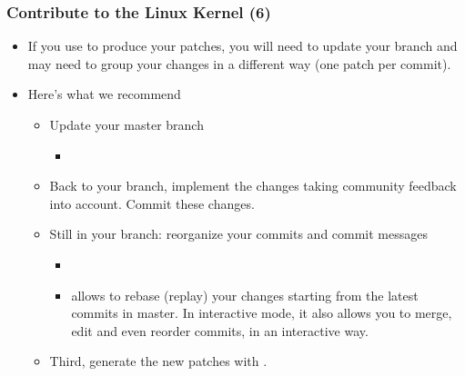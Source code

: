 \begin{frame}
  \frametitle{Contribute to the Linux Kernel (6)}
  \begin{itemize}
  \item If you use  to produce your patches,
    you will need to update your branch and may need to group your
    changes in a different way (one patch per commit).
  \item Here's what we recommend
    \begin{itemize}
    \item Update your master branch
      \begin{itemize}
      \item {}
      \end{itemize}
    \item Back to your branch, implement the changes taking community
      feedback into account. Commit these changes.
    \item Still in your branch: reorganize your commits and commit messages
      \begin{itemize}
      \item {}
      \item {} allows to rebase (replay) your changes
        starting from the latest commits in master. In interactive
        mode, it also allows you to merge, edit and even reorder
        commits, in an interactive way.
      \end{itemize}
    \item Third, generate the new patches with .
    \end{itemize}
  \end{itemize}
\end{frame}


